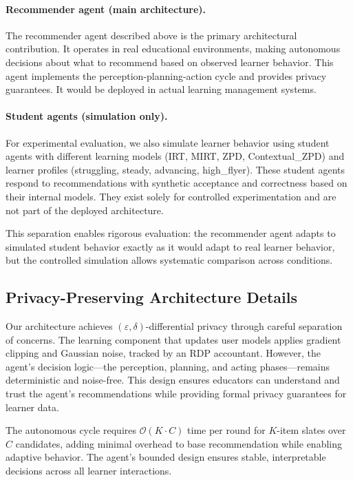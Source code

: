\paragraph{Recommender agent (main architecture).} The recommender agent described above is the primary architectural contribution. It operates in real educational environments, making autonomous decisions about what to recommend based on observed learner behavior. This agent implements the perception-planning-action cycle and provides privacy guarantees. It would be deployed in actual learning management systems.

\paragraph{Student agents (simulation only).} For experimental evaluation, we also simulate learner behavior using student agents with different learning models (IRT, MIRT, ZPD, Contextual\_ZPD) and learner profiles (struggling, steady, advancing, high\_flyer). These student agents respond to recommendations with synthetic acceptance and correctness based on their internal models. They exist solely for controlled experimentation and are not part of the deployed architecture.

This separation enables rigorous evaluation: the recommender agent adapts to simulated student behavior exactly as it would adapt to real learner behavior, but the controlled simulation allows systematic comparison across conditions.

\subsection{Privacy-Preserving Architecture Details}
\label{subsec:arch-privacy-detailed}
Our architecture achieves \((\varepsilon,\delta)\)-differential privacy through careful separation of concerns. The learning component that updates user models applies gradient clipping and Gaussian noise, tracked by an RDP accountant. However, the agent's decision logic—the perception, planning, and acting phases—remains deterministic and noise-free. This design ensures educators can understand and trust the agent's recommendations while providing formal privacy guarantees for learner data.

The autonomous cycle requires \(\mathcal{O}(K \cdot C)\) time per round for \(K\)-item slates over \(C\) candidates, adding minimal overhead to base recommendation while enabling adaptive behavior. The agent's bounded design ensures stable, interpretable decisions across all learner interactions.

